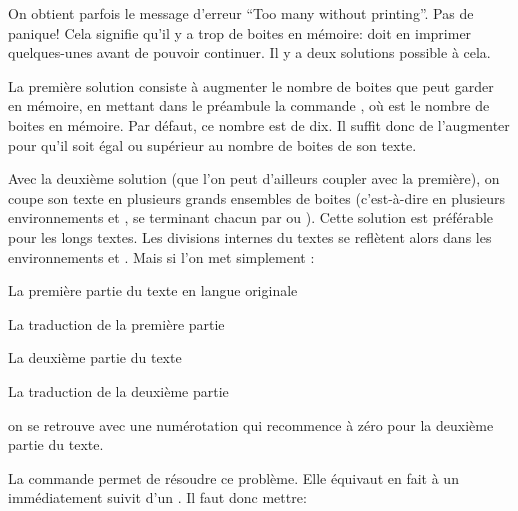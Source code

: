 On obtient parfois le message d'erreur \enquote{Too many  without printing}. Pas de panique! Cela signifie qu'il y a trop de boites en mémoire: \latex  doit en imprimer quelques-unes avant de pouvoir continuer.  Il y a deux solutions possible à cela.

La première solution consiste à  augmenter le nombre de boites que  peut garder en mémoire, en mettant dans le préambule la commande , où  est le nombre de boites en mémoire. Par défaut, ce nombre est de dix. Il suffit donc de l'augmenter  pour qu'il soit égal ou supérieur au nombre de boites de son  texte.


Avec la deuxième solution (que l'on peut d'ailleurs coupler avec la première), on  coupe son texte en plusieurs grands ensembles de boites (c'est-à-dire en plusieurs environnements  et , se terminant chacun par  ou ).  Cette solution est préférable pour les longs textes. Les divisions internes du textes se reflètent alors dans les environnements  et .   Mais si l'on met simplement :

\begin{latexcode*}
\begin{pages}  
	\begin{Leftside}  \beginnumbering 
La première partie du texte en langue originale
	\endnumbering  \end{Leftside} 
 
	\begin{Rightside} \beginnumbering
La traduction de la première partie
	\endnumbering \end{Rightside} 
 \Pages
 
	\begin{Leftside} \beginnumbering  
La deuxième partie du texte 
	\endnumbering  \end{Leftside} 
 
	\begin{Rightside}  \beginnumbering
La traduction de la deuxième partie
	\endnumbering \end{Rightside} 
 \Pages

  \end{pages}
\end{latexcode*}

on se retrouve avec une numérotation qui recommence à zéro pour la deuxième partie du texte. 

La commande  permet de résoudre ce problème. Elle équivaut en fait à un  immédiatement suivit d'un . Il faut donc mettre: 

